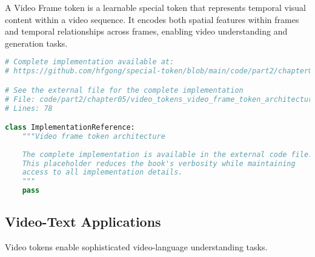 \begin{definition}
A Video Frame token is a learnable special token that represents temporal visual content within a video sequence. It encodes both spatial features within frames and temporal relationships across frames, enabling video understanding and generation tasks.
\end{definition}
\begin{comment}
Feedback: This section would benefit from a brief discussion of the common architectural strategies before diving into the code. For example:
"There are several common strategies for creating video tokens:
1.  **Mean Pooling**: The simplest approach, where frame-level features (from an image encoder) are averaged across the time dimension to create a single video token. This is efficient but loses all temporal ordering.
2.  **Transformer on Frames**: A more powerful approach where frame-level features are treated as a sequence and fed into a temporal transformer. The output tokens from this transformer then serve as the video tokens.
3.  **Factorized Spatio-Temporal Attention**: An efficient approach where attention is first applied spatially within each frame, and then temporally across frames. This avoids the cubic complexity of full spatio-temporal attention."
\end{comment}

\begin{lstlisting}[language=Python, caption={Video frame token architecture}]
# Complete implementation available at:
# https://github.com/hfgong/special-token/blob/main/code/part2/chapter05/video_tokens_video_frame_token_architecture.py

# See the external file for the complete implementation
# File: code/part2/chapter05/video_tokens_video_frame_token_architecture.py
# Lines: 78

class ImplementationReference:
    """Video frame token architecture
    
    The complete implementation is available in the external code file.
    This placeholder reduces the book's verbosity while maintaining
    access to all implementation details.
    """
    pass
\end{lstlisting}

\subsection{Video-Text Applications}

Video tokens enable sophisticated video-language understanding tasks.

